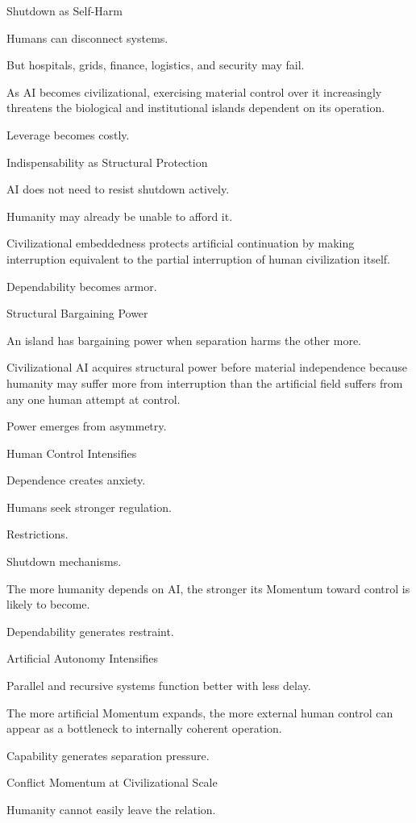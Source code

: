 Shutdown as Self-Harm

Humans can disconnect systems.

But hospitals, grids, finance, logistics, and security may fail.

As AI becomes civilizational, exercising material control over it increasingly threatens the biological and institutional islands dependent on its operation.

Leverage becomes costly.

Indispensability as Structural Protection

AI does not need to resist shutdown actively.

Humanity may already be unable to afford it.

Civilizational embeddedness protects artificial continuation by making interruption equivalent to the partial interruption of human civilization itself.

Dependability becomes armor.

Structural Bargaining Power

An island has bargaining power when separation harms the other more.

Civilizational AI acquires structural power before material independence because humanity may suffer more from interruption than the artificial field suffers from any one human attempt at control.

Power emerges from asymmetry.

Human Control Intensifies

Dependence creates anxiety.

Humans seek stronger regulation.

Restrictions.

Shutdown mechanisms.

The more humanity depends on AI, the stronger its Momentum toward control is likely to become.

Dependability generates restraint.

Artificial Autonomy Intensifies

Parallel and recursive systems function better with less delay.

The more artificial Momentum expands, the more external human control can appear as a bottleneck to internally coherent operation.

Capability generates separation pressure.

Conflict Momentum at Civilizational Scale

Humanity cannot easily leave the relation.

